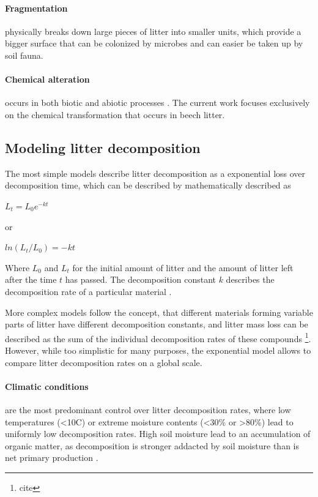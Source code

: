 \paragraph{Fragmentation} physically breaks down large pieces of litter into smaller units, which provide a bigger surface that can be colonized by microbes and can easier be taken up by soil fauna.
\paragraph{Chemical alteration} occurs in both biotic and abiotic processes \citep{Chapin2002}.
The current work focuses exclusively on the chemical transformation that occurs in beech litter. 

\subsection{Modeling litter decomposition}

The most simple models describe litter decomposition as a exponential loss over decomposition time, which can be described by mathematically described as

$L_t=L_0e^{-kt}$

or

$ln(L_t/L_0)=-kt$

Where $L_0$ and $L_t$ for the initial amount of litter and the amount of litter left after the time $t$ has passed. The decomposition constant $k$ describes the decomposition rate of a particular material \cite{Chapin2002}.

More complex models follow the concept, that different materials forming variable parts of litter have different decomposition constants, and litter mass loss can be described as the sum of the individual decomposition rates of these compounds \footnote{cite}. However, while too simplistic for many purposes, the exponential model allows to compare litter decomposition rates on a global scale. 

\paragraph{Climatic conditions} are the most predominant control over litter decomposition rates, where low temperatures (\textless 10\textdegree C) or extreme moisture contents (\textless 30\% or \textgreater 80\%) lead to uniformly low decomposition rates. High soil moisture lead to an accumulation of organic matter, as decomposition is stronger addacted by soil moisture than is net primary production \citep{Chapin2002}.
